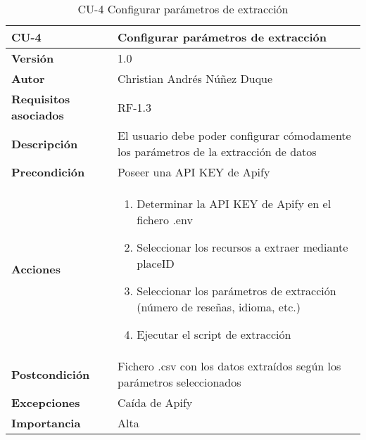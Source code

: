 \begin{table}[p]
	\centering
	\begin{tabularx}{\linewidth}{ p{} p{} }
		\toprule
		\textbf{CU-4}    & \textbf{Configurar parámetros de extracción}\\
		\toprule
		\textbf{Versión}              & 1.0    \\
		\textbf{Autor}                & Christian Andrés Núñez Duque \\
		\textbf{Requisitos asociados} & RF-1.3 \\
		\textbf{Descripción}          & El usuario debe poder configurar cómodamente los parámetros de la extracción de datos \\
		\textbf{Precondición}         & Poseer una API KEY de Apify \\
		\textbf{Acciones}             &
		\begin{enumerate}
			\def\labelenumi{\arabic{enumi}.}
			\tightlist
			\item Determinar la API KEY de Apify en el fichero .env
			\item Seleccionar los recursos a extraer mediante placeID
			\item Seleccionar los parámetros de extracción (número de reseñas, idioma, etc.)
			\item Ejecutar el script de extracción
		\end{enumerate}\\
		\textbf{Postcondición}        & Fichero .csv con los datos extraídos según los parámetros seleccionados \\
		\textbf{Excepciones}          & Caída de Apify \\
		\textbf{Importancia}          & Alta \\
		\bottomrule
	\end{tabularx}
	\caption{CU-4 Configurar parámetros de extracción}
\end{table}

